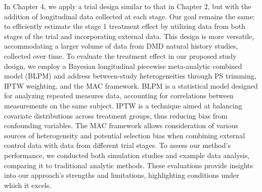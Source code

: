 In Chapter 4, we apply a trial design similar to that in Chapter 2, but with the addition of longitudinal data collected at each stage. Our goal remains the same: to efficiently estimate the stage 1 treatment effect by utilizing data from both stages of the trial and incorporating external data. This design is more versatile, accommodating a larger volume of data from \ac{DMD} natural history studies, collected over time. To evaluate the treatment effect in our proposed study design, we employ a Bayesian longitudinal piecewise meta-analytic combined model (\ac{BLPM}) and address between-study heterogeneities through \ac{PS} trimming, \ac{IPTW} weighting, and the \ac{MAC} framework. \ac{BLPM} is a statistical model designed for analyzing repeated measures data, accounting for correlations between measurements on the same subject. \ac{IPTW} is a technique aimed at balancing covariate distributions across treatment groups, thus reducing bias from confounding variables. The \ac{MAC} framework allows consideration of various sources of heterogeneity and potential selection bias when combining external control data with data from different trial stages. To assess our method's performance, we conducted both simulation studies and example data analysis, comparing it to traditional analytic methods. These evaluations provide insights into our approach's strengths and limitations, highlighting conditions under which it excels.
